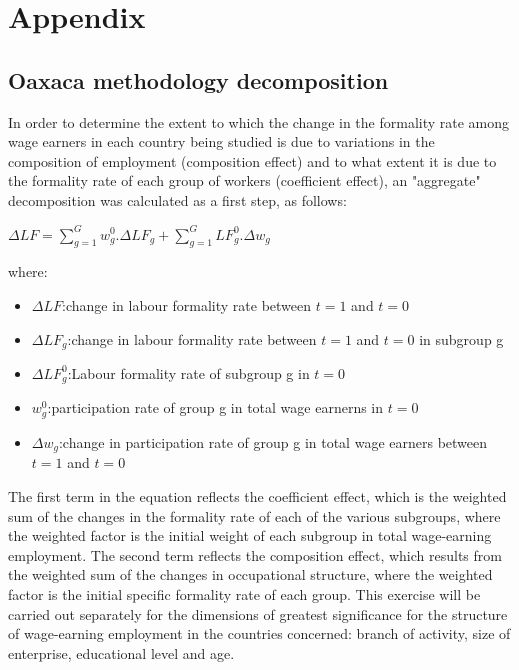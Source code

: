 \documentclass[english]{article}
\begin{document}
\newpage
\section{Appendix}
\subsection{Oaxaca methodology decomposition}
In order to determine the extent to which the change in the formality rate among wage earners in each country being studied is due to variations in the composition of employment (composition effect) and to what extent it is due to the formality rate of each group of workers (coefficient effect), an "aggregate" decomposition was calculated as a first step, as follows:

${\Delta}LF=\sum_{g=1}^{G}w_g^{0}.{\Delta}LF_g+\sum_{g=1}^{G}LF_g^{0}.{\Delta}w_g$

where:
\begin{itemize}

\item ${\Delta}LF$:change in labour formality rate between $t=1$ and $t=0$ 
\item ${\Delta}LF_g$:change in labour formality rate between $t=1$ and $t=0$ in subgroup g
\item ${\Delta}LF_g^{0}$:Labour formality rate of subgroup g in $t=0$
\item $w_g^{0}$:participation rate of group g in total wage earnerns in $t=0$
\item ${\Delta}w_g$:change in participation rate of group g in total wage earners between $t=1$ and $t=0$ 
\end{itemize}

The first term in the equation reflects the coefficient effect, which is the weighted sum of the changes in the formality rate of each of the various subgroups, where the weighted factor is the initial weight of each subgroup in total wage-earning employment. The second term reflects the composition effect, which results from the weighted sum of the changes in occupational structure, where the weighted factor is the initial specific formality rate of each group.
This exercise will be carried out separately for the dimensions of greatest significance for the structure of wage-earning employment in the countries concerned: branch of activity, size of enterprise, educational level and age.
\end{document}
